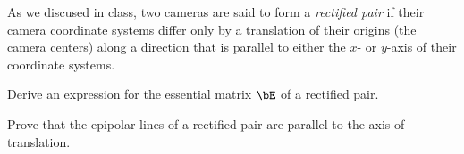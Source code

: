 \begin{problem}
  As we discused in class, two cameras are said to form a \emph{rectified pair}
  if their camera coordinate systems differ only by a translation of their origins
  (the camera centers) along a direction that is parallel to either the $x$- or $y$-axis
  of their coordinate systems.

  \begin{enumroman}
    \item Derive an expression for the essential matrix $\bE$ of a rectified pair.
      \begin{answer}

      \end{answer}
    \item Prove that the epipolar lines of a rectified pair are parallel to
      the axis of translation.
      \begin{answer}

      \end{answer}
  \end{enumroman}
\end{problem}

